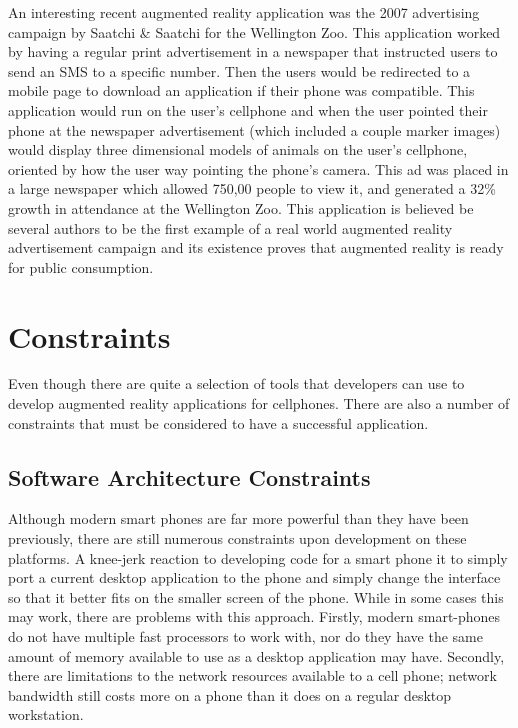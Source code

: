 \documentclass{acm_proc_article-sp}
\begin{document}
An interesting recent augmented reality application was the 2007 advertising campaign by Saatchi \& Saatchi
for the Wellington Zoo.  This application worked by having a regular print advertisement in a newspaper that instructed users to send an SMS to a specific number.  Then the users would be redirected to a mobile page to download an application if their phone was compatible.  This application would run on the user's cellphone and when the user pointed their phone at the newspaper advertisement (which included a couple marker images) would display three dimensional models of animals on the user's cellphone, oriented by how the user way pointing the phone's camera.  \cite{henrysson2007bringing} This ad was placed in a large newspaper which allowed 750,00 people to view it, and generated a 32\% growth in attendance at the Wellington Zoo. \cite{ar.wellington.zoo}  This application is believed be several authors to be the first example of a real world augmented reality advertisement campaign and its existence proves that augmented reality is ready for public consumption. \cite{henrysson2007bringing} \cite{wang2010authoring}

\section{Constraints}
Even though there are quite a selection of tools that developers can use to develop augmented reality applications for cellphones. There are also a number of constraints that must be considered to have a successful application.
\subsection{Software Architecture Constraints}
Although modern smart phones are far more powerful than they have been previously, there are still numerous constraints upon development on these platforms.  A knee-jerk reaction to developing code for a smart phone it to simply port a current desktop application to the phone and simply change the interface so that it better fits on the smaller screen of the phone.  While in some cases this may work, there are problems with this approach.  Firstly, modern smart-phones do not have multiple fast processors to work with, nor do they have the same amount of memory available to use as a desktop application may have.  Secondly, there are limitations to the network resources available to a cell phone; network bandwidth still costs more on a phone than it does on a regular desktop workstation.  \cite{wagner2009making}  
\end{document}
